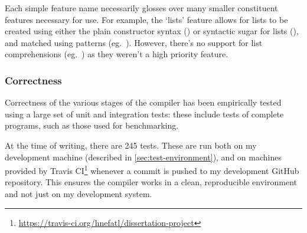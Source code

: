 \documentclass[dissertation.tex]{subfiles}
\begin{document}
{    

    Each simple feature name necessarily glosses over many smaller constituent features necessary for use. For example,
    the `lists' feature allows for lists to be created using either the plain constructor syntax
    () or syntactic sugar for lists (\haskell{[1,2,3]}), and matched using patterns (eg.\
    \haskell{[x,y] = [1,2]}). However, there's no support for list comprehensions (eg.\ \haskell{[f x | x <- [1,2,3],
    even x]}) as they weren't a high priority feature.


    
    \subsubsection{Correctness}
    {

        Correctness of the various stages of the compiler has been empirically tested using a large set of unit and
        integration tests: these include tests of complete programs, such as those used for benchmarking.
        
        At the time of writing, there are 245 tests. These are run both on my development machine
        (described in \ref{sec:test-environment}), and on machines provided by Travis
        CI\footnote{\url{https://travis-ci.org/hnefatl/dissertation-project}} whenever a commit is pushed to my
        development GitHub repository. This ensures the compiler works in a clean, reproducible environment and not just
        on my development system.
        
    }
}
\end{document}
